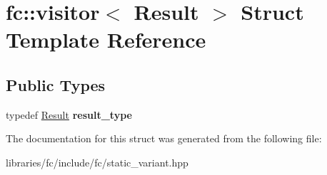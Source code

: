 \hypertarget{structfc_1_1visitor}{}\section{fc\+:\+:visitor$<$ Result $>$ Struct Template Reference}
\label{structfc_1_1visitor}
\subsection*{Public Types}
\begin{DoxyCompactItemize}
\item 
\mbox{\label{structfc_1_1visitor_ab43e3eb72b36ff7e3a82f6201e2bfc90}} 
typedef \mbox{\hyperlink{struct_result}{Result}} {\bfseries result\+\_\+type}
\end{DoxyCompactItemize}


The documentation for this struct was generated from the following file\+:\begin{DoxyCompactItemize}
\item 
libraries/fc/include/fc/static\+\_\+variant.\+hpp\end{DoxyCompactItemize}

